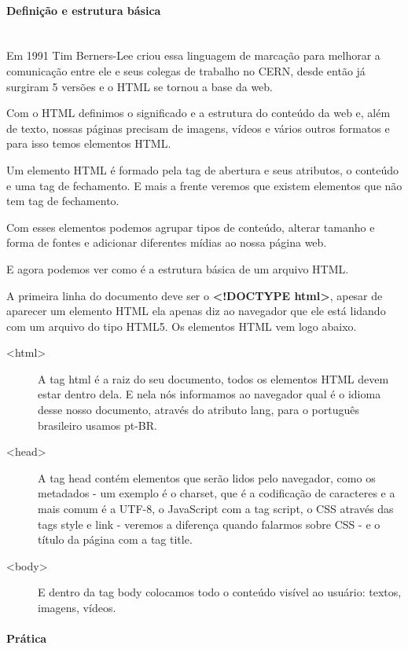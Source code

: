 \documentclass[12pt,a4paper]{article}
\begin{document}
	\paragraph{Definição e estrutura básica} \mbox{}\\
	
	Em 1991 Tim Berners-Lee criou essa linguagem de marcação para melhorar a comunicação entre ele e seus colegas de trabalho no CERN, desde então já surgiram 5 versões e o HTML se tornou a base da web.
	
	Com o HTML definimos o significado e a estrutura do conteúdo da web e, além de texto, nossas páginas precisam de imagens, vídeos e vários outros formatos e para isso temos elementos HTML.
	
	Um elemento HTML é formado pela tag de abertura e seus atributos, o conteúdo e uma tag de fechamento. E mais a frente veremos que existem elementos que não tem tag de fechamento.
	
	Com esses elementos podemos agrupar tipos de conteúdo, alterar tamanho e forma de fontes e adicionar diferentes mídias ao nossa página web.
	
	E agora podemos ver como é a estrutura básica de um arquivo HTML.
	
	A primeira linha do documento deve ser o \textbf{<!DOCTYPE html>}, apesar de aparecer um elemento HTML ela apenas diz ao navegador que ele está lidando com um arquivo do tipo HTML5. Os elementos HTML vem logo abaixo.
	
	\begin{description}
		\item[<html>] A tag html é a raiz do seu documento, todos os elementos HTML devem estar dentro dela. E nela nós informamos ao navegador qual é o idioma desse nosso documento, através do atributo lang, para o português brasileiro usamos pt-BR.
		\item[<head>] A tag head contém elementos que serão lidos pelo navegador, como os metadados - um exemplo é o charset, que é a codificação de caracteres e a mais comum é a UTF-8, o JavaScript com a tag script, o CSS através das tags style e link - veremos a diferença quando falarmos sobre CSS - e o título da página com a tag title.
		\item[<body>] E dentro da tag body colocamos todo o conteúdo visível ao usuário: textos, imagens, vídeos.
	\end{description}
	
	\paragraph{Prática} \mbox{}\\
	
\end{document}
